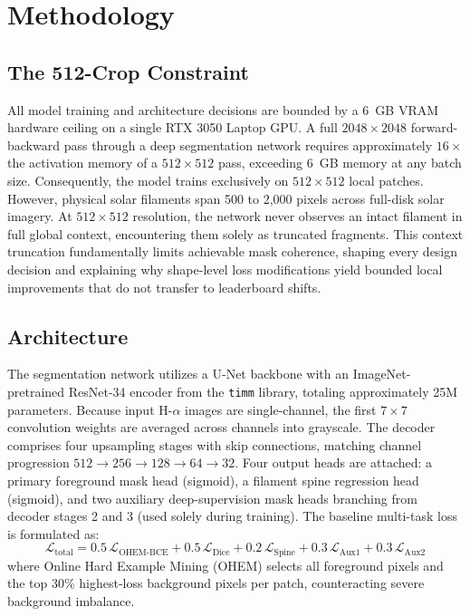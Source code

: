 \documentclass[sigconf]{acmart}
\begin{document}
\section{Methodology}\label{sec:methodology}

\subsection{The 512-Crop Constraint}\label{sec:crop_constraint}
All model training and architecture decisions are bounded by a 6~GB VRAM hardware ceiling on a single RTX 3050 Laptop GPU. A full $2048\times2048$ forward-backward pass through a deep segmentation network requires approximately $16\times$ the activation memory of a $512\times512$ pass, exceeding 6~GB memory at any batch size. Consequently, the model trains exclusively on $512\times512$ local patches. However, physical solar filaments span 500 to 2,000 pixels across full-disk solar imagery. At $512\times512$ resolution, the network never observes an intact filament in full global context, encountering them solely as truncated fragments. This context truncation fundamentally limits achievable mask coherence, shaping every design decision and explaining why shape-level loss modifications yield bounded local improvements that do not transfer to leaderboard shifts.

\subsection{Architecture}\label{sec:architecture}
The segmentation network utilizes a U-Net backbone \cite{ronneberger2015unet} with an ImageNet-pretrained ResNet-34 encoder \cite{he2016deep} from the \texttt{timm} library, totaling approximately 25M parameters. Because input H-$\alpha$ images are single-channel, the first $7\times7$ convolution weights are averaged across channels into grayscale. The decoder comprises four upsampling stages with skip connections, matching channel progression $512\to256\to128\to64\to32$. Four output heads are attached: a primary foreground mask head (sigmoid), a filament spine regression head (sigmoid), and two auxiliary deep-supervision mask heads branching from decoder stages 2 and 3 (used solely during training). The baseline multi-task loss is formulated as:
\begin{equation}
\mathcal{L}_{\text{total}} = 0.5\,\mathcal{L}_{\text{OHEM-BCE}} + 0.5\,\mathcal{L}_{\text{Dice}} + 0.2\,\mathcal{L}_{\text{Spine}} + 0.3\,\mathcal{L}_{\text{Aux1}} + 0.3\,\mathcal{L}_{\text{Aux2}}
\end{equation}
where Online Hard Example Mining (OHEM) selects all foreground pixels and the top 30\% highest-loss background pixels per patch, counteracting severe background imbalance.
\end{document}
